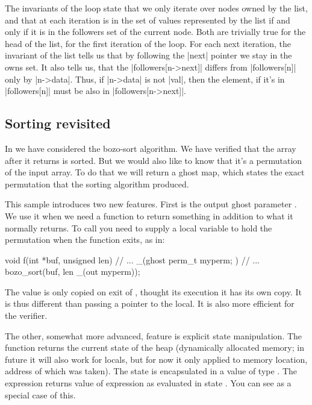 \noindent
The invariants of the  loop state that we only iterate over
nodes owned by the list, and that at each iteration  is in the
set of values represented by the list if and only if it is in the followers
set of the current node.
Both are trivially true for the head of the list, for the first iteration
of the loop.
For each next iteration, the invariant of the list tells us that by following
the \vcc|next| pointer we stay in the owns set.
It also tells us, that the \vcc|followers[n->next]| differs
from \vcc|followers[n]| only by \vcc|n->data|.
Thus, if \vcc|n->data| is not \vcc|val|, then the element,
if it's in \vcc|followers[n]| must be also in \vcc|followers[n->next]|.

\subsection{Sorting revisited}
\label{sect:sorting-perm}

In  we have considered the bozo-sort algorithm. 
We have verified that the array after it returns is sorted.
But we would also like to know that it's a permutation of the input array.
To do that we will return a ghost map, which states the exact permutation
that the sorting algorithm produced.


This sample introduces two new features.
First is the output ghost parameter .
We use it when we need a function to return something in addition to what it normally returns.
To call  you need to supply a local variable to hold
the permutation when the function exits, as in:
\begin{VCC}
void f(int *buf, unsigned len)
  // ...
{
  _(ghost perm_t myperm; )
  // ...
  bozo_sort(buf, len _(out myperm));
}
\end{VCC}
The value is only copied on exit of , thought its execution 
it has its own copy.
It is thus different than passing a pointer to the local.
It is also more efficient for the verifier.

The other, somewhat more advanced, feature is explicit state manipulation.
The function \vcc{\now()} returns the current state of the heap (\ie dynamically
allocated memory; in future it will also work for locals, but for now it only applied
to memory location, address of which was taken). 
The state is encapsulated in a value of type \vcc{\state}.
The expression  returns value of expression
 as evaluated in state . 
You can see   as a special case of this.

